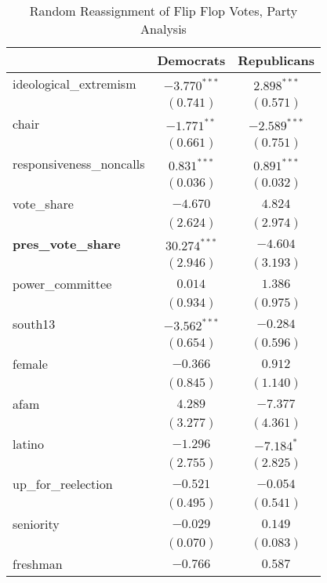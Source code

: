 \documentclass[12pt]{article}
\begin{document}
\begin{table}
	\begin{center}
		\caption{Random Reassignment of Flip Flop Votes, Party Analysis}
		\begin{tabular}{l c c }
			\hline
			& Democrats & Republicans \\
			\hline
			ideological\_extremism   & $-3.770^{***}$ & $2.898^{***}$  \\
			& $(0.741)$      & $(0.571)$      \\
			chair                    & $-1.771^{**}$  & $-2.589^{***}$ \\
			& $(0.661)$      & $(0.751)$      \\
			responsiveness\_noncalls & $0.831^{***}$  & $0.891^{***}$  \\
			& $(0.036)$      & $(0.032)$      \\
			vote\_share              & $-4.670$       & $4.824$        \\
			& $(2.624)$      & $(2.974)$      \\
			\textbf{pres\_vote\_share}        & $30.274^{***}$ & $-4.604$       \\
			& $(2.946)$      & $(3.193)$      \\
			power\_committee         & $0.014$        & $1.386$        \\
			& $(0.934)$      & $(0.975)$      \\
			south13                  & $-3.562^{***}$ & $-0.284$       \\
			& $(0.654)$      & $(0.596)$      \\
			female                   & $-0.366$       & $0.912$        \\
			& $(0.845)$      & $(1.140)$      \\
			afam                     & $4.289$        & $-7.377$       \\
			& $(3.277)$      & $(4.361)$      \\
			latino                   & $-1.296$       & $-7.184^{*}$   \\
			& $(2.755)$      & $(2.825)$      \\
			up\_for\_reelection      & $-0.521$       & $-0.054$       \\
			& $(0.495)$      & $(0.541)$      \\
			seniority                & $-0.029$       & $0.149$        \\
			& $(0.070)$      & $(0.083)$      \\
			freshman                 & $-0.766$       & $0.587$        \\

\end{tabular}
\end{center}
\end{table}
\end{document}
